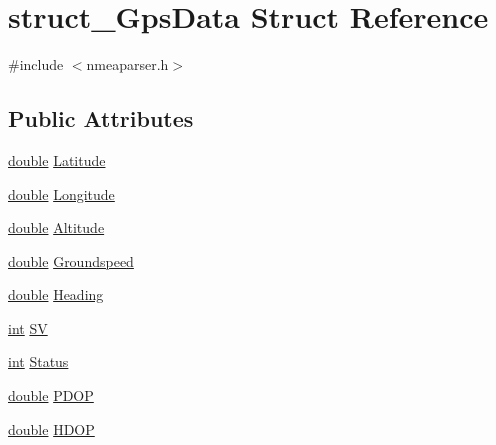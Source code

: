 \hypertarget{structstruct___gps_data}{\section{struct\-\_\-\-Gps\-Data Struct Reference}
\label{structstruct___gps_data}
}


{\ttfamily \#include $<$nmeaparser.\-h$>$}

\subsection*{Public Attributes}
\begin{DoxyCompactItemize}
\item 
\hyperlink{_super_l_u_support_8h_a8956b2b9f49bf918deed98379d159ca7}{double} \hyperlink{group___g_p_s_gadget_plugin_ga22dd27dba6f143463f812eda429ca6ea}{Latitude}
\item 
\hyperlink{_super_l_u_support_8h_a8956b2b9f49bf918deed98379d159ca7}{double} \hyperlink{group___g_p_s_gadget_plugin_ga63cb298938d490dd35e8a5dbd099f65e}{Longitude}
\item 
\hyperlink{_super_l_u_support_8h_a8956b2b9f49bf918deed98379d159ca7}{double} \hyperlink{group___g_p_s_gadget_plugin_ga7114820c879b9cfa5c6511ee87fb7837}{Altitude}
\item 
\hyperlink{_super_l_u_support_8h_a8956b2b9f49bf918deed98379d159ca7}{double} \hyperlink{group___g_p_s_gadget_plugin_ga96522460814507cd49570c6edbecdc4a}{Groundspeed}
\item 
\hyperlink{_super_l_u_support_8h_a8956b2b9f49bf918deed98379d159ca7}{double} \hyperlink{group___g_p_s_gadget_plugin_ga11eede30f67268e28aac52350a2de20c}{Heading}
\item 
\hyperlink{ioapi_8h_a787fa3cf048117ba7123753c1e74fcd6}{int} \hyperlink{group___g_p_s_gadget_plugin_gad4c8228c92e708ffbf1205af7955a571}{S\-V}
\item 
\hyperlink{ioapi_8h_a787fa3cf048117ba7123753c1e74fcd6}{int} \hyperlink{group___g_p_s_gadget_plugin_gafecfb74415dbfe5f6bc3c950183eb3b2}{Status}
\item 
\hyperlink{_super_l_u_support_8h_a8956b2b9f49bf918deed98379d159ca7}{double} \hyperlink{group___g_p_s_gadget_plugin_ga686c0fa6dc1d7aa494b494fe38bb8834}{P\-D\-O\-P}
\item 
\hyperlink{_super_l_u_support_8h_a8956b2b9f49bf918deed98379d159ca7}{double} \hyperlink{group___g_p_s_gadget_plugin_ga7bea5e7cb8f6a97c8b2be703401218e3}{H\-D\-O\-P}
\item 

\end{DoxyCompactItemize}
